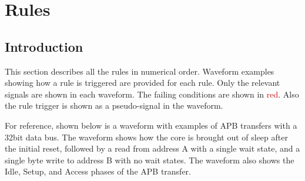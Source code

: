 \chapter{Rules}

\section{Introduction}

This section describes all the rules in numerical order. Waveform examples showing how a rule is triggered are provided for each rule. Only the relevant signals are shown in each waveform. The failing conditions are shown in \textcolor{red}{red}. Also the rule trigger is shown as a pseudo-signal in the waveform.

For reference, shown below is a waveform with examples of APB transfers with a 32bit data bus. The waveform shows how the core is brought out of sleep after the initial reset, followed by  a read from address A with a single wait state, and a single byte write to address B with no wait states.
The waveform also shows the Idle, Setup, and Access phases of the APB transfer.

